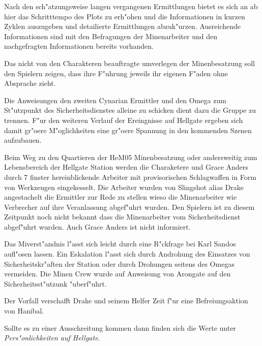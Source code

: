 \begin{remarks}
	Nach den sch"atzungsweise langen vergangenen Ermittlungen bietet es sich an ab hier das Schritttempo des Plots zu erh"ohen und die Informationen in kurzen Zyklen auszugeben und detailierte Ermittlungen abzuk"urzen. Ausreichende Informationen sind mit den Befragungen der Minenarbeiter und den nachgefragten Informationen bereits vorhanden.

	Das nicht von den Charakteren beauftragte umverlegen der Minenbesatzung soll den Spielern zeigen, dass ihre F"uhrung jeweils ihr eigenen F"aden ohne Absprache zieht.

	Die Anweisungen den zweiten Cynarian Ermittler und den Omega zum St"utzpunkt des Sicherheitsdienstes alleine zu schicken dient dazu die Gruppe zu trennen. F"ur den weiteren Verlauf der Ereingnisse auf Hellgate ergeben sich damit gr"o\3ere M"oglichkeiten eine gr"o\3ere Spannung in den kommenden Szenen aufzubauen.
\end{remarks}


Beim Weg zu den Quartieren der HeM05 Minenbesatzung oder andersweitig zum Lebensbereich der Hellgate Station werden die Charaketere und Grace Anders durch 7 finster hereinblickende Arbeiter mit provisorischen Schlagwaffen in Form von Werkzeugen eingekesselt. Die Arbeiter wurden von Slingshot alias Drake angestachelt die Ermittler zur Rede zu stellen wieso die Minenarbeiter wie Verbrecher auf ihre Veranlassung abgef"uhrt wurden. Den Spielern ist zu diesem Zeitpunkt noch nicht bekannt dass die Minenarbeiter vom Sicherheitsdienst abgef"uhrt wurden. Auch Grace Anders ist nicht informiert.

\begin{remarks}
	Das Mi\3verst"andnis l"asst sich leicht durch eine R"ckfrage bei Karl Sandos aufl"osen lassen. Ein Eskalation l"asst sich durch Androhung des Einsatzes von Sicherheitskr"aften der Station oder durch Drohungen seitens des Omegas vermeiden. Die Minen Crew wurde auf Anweisung von Arongate auf den Sicherheitsst"utzunk "uberf"uhrt.
	
	Der Vorfall verschafft Drake und seinem Helfer Zeit f"ur eine Befreiungsaktion von Hanibal.

	Sollte es zu einer Ausschreitung kommen dann finden sich die Werte unter \emph{Pers"onlichkeiten auf Hellgate}.
\end{remarks}


